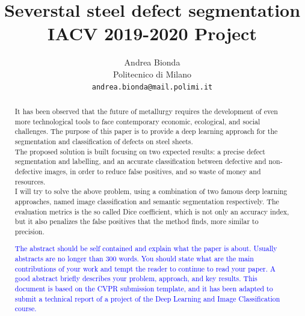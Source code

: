 \documentclass[10pt,twocolumn,letterpaper]{article}
\begin{document}
\title{Severstal steel defect segmentation \\ IACV 2019-2020 Project} 

\author{Andrea Bionda\\
Politecnico di Milano\\
{\tt\small andrea.bionda@mail.polimi.it}}

\maketitle

\begin{abstract}
   It has been observed that the future of metallurgy requires the development of even more technological tools to face contemporary economic, ecological, and social challenges.
   The purpose of this paper is to provide a deep learning approach for the segmentation and classification of defects on steel sheets.\\
   The proposed solution is built focusing on two expected results: a precise defect segmentation and labelling, and an accurate classification between defective and non-defective images, in order to reduce false positives, and so waste of money and resources.\\
   I will try to solve the above problem, using a combination of two famous deep learning approaches, named image classification and semantic segmentation respectively.
   The evaluation metrics is the so called Dice coefficient, which is not only an accuracy index, but it also penalizes the false positives that the method finds, more similar to precision.

   \textcolor{blue}{
   The abstract should be self contained and explain what the paper is about. Usually abstracts are no longer than 300 words. You should state what are the main contributions of your work and tempt the reader to continue to read your paper. A good abstract briefly describes your problem, approach, and key results. This document is based on the CVPR submission template, and it has been adapted to submit a technical report of a project of the Deep Learning and Image Classification course.}
\end{abstract}

\graphicspath{ {./Resources/} }
\end{document}
